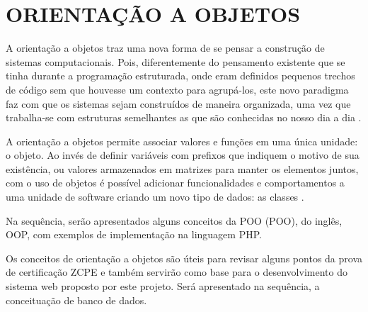 \section{ORIENTAÇÃO A OBJETOS}

A orientação a objetos traz uma nova forma de se pensar a construção de sistemas
computacionais. Pois, diferentemente do pensamento existente que se tinha
durante a programação estruturada, onde eram definidos pequenos trechos de 
código sem que houvesse um contexto para agrupá-los, este novo paradigma faz 
com que os sistemas sejam construídos de maneira organizada, uma vez que 
trabalha-se com estruturas semelhantes as que são conhecidas no nosso dia a dia
\cite{phpProgramandoComOrientacaoAObjetos}.

A orientação a objetos permite associar valores e funções em uma única
unidade: o objeto. Ao invés de definir variáveis com prefixos que indiquem o 
motivo de sua existência, ou valores armazenados em matrizes para manter os 
elementos juntos, com o uso de objetos é possível adicionar funcionalidades e 
comportamentos a uma unidade de software criando um novo tipo de dados: as 
classes \cite{phpMasterWriteCuttingEdgeCode}.

Na sequência, serão apresentados alguns conceitos da \acl{POO} (\acs{POO}), do
inglês, \ac{OOP}, com exemplos de implementação na linguagem \acs{PHP}.















Os conceitos de orientação a objetos são úteis para revisar alguns pontos da
prova de certificação \acs{ZCPE} e também servirão como base para o
desenvolvimento do sistema web proposto por este projeto. Será apresentado na
sequência, a conceituação de banco de dados.
